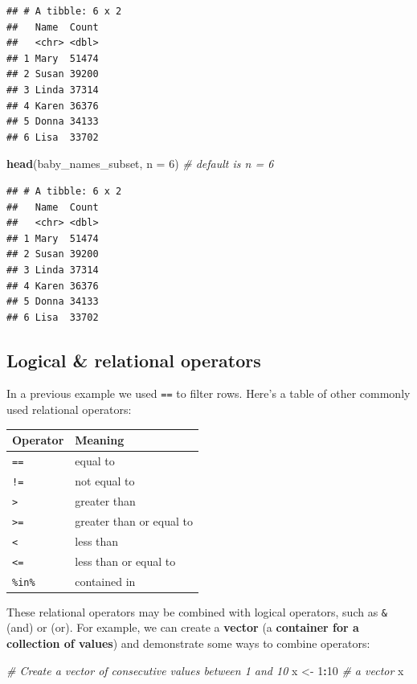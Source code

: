 \documentclass[
]{book}
\newenvironment{Shaded}{\begin{snugshade}}{\end{snugshade}}
\newcommand{\CommentTok}[1]{\textcolor[rgb]{0.56,0.35,0.01}{\textit{#1}}}
\newcommand{\DataTypeTok}[1]{\textcolor[rgb]{0.13,0.29,0.53}{#1}}
\newcommand{\DecValTok}[1]{\textcolor[rgb]{0.00,0.00,0.81}{#1}}
\newcommand{\KeywordTok}[1]{\textcolor[rgb]{0.13,0.29,0.53}{\textbf{#1}}}
\newcommand{\NormalTok}[1]{#1}
\newcommand{\OperatorTok}[1]{\textcolor[rgb]{0.81,0.36,0.00}{\textbf{#1}}}
\newcommand{\StringTok}[1]{\textcolor[rgb]{0.31,0.60,0.02}{#1}}
\begin{document}
\begin{verbatim}
## # A tibble: 6 x 2
##   Name  Count
##   <chr> <dbl>
## 1 Mary  51474
## 2 Susan 39200
## 3 Linda 37314
## 4 Karen 36376
## 5 Donna 34133
## 6 Lisa  33702
\end{verbatim}

\begin{Shaded}
\begin{Highlighting}[]
\KeywordTok{head}\NormalTok{(baby\_names\_subset, }\DataTypeTok{n =} \DecValTok{6}\NormalTok{) }\CommentTok{\# default is n = 6}
\end{Highlighting}
\end{Shaded}

\begin{verbatim}
## # A tibble: 6 x 2
##   Name  Count
##   <chr> <dbl>
## 1 Mary  51474
## 2 Susan 39200
## 3 Linda 37314
## 4 Karen 36376
## 5 Donna 34133
## 6 Lisa  33702
\end{verbatim}

\hypertarget{logical-relational-operators}{%
\subsection{Logical \& relational operators}\label{logical-relational-operators}}

In a previous example we used \texttt{==} to filter rows. Here's a table of other commonly used relational operators:

\begin{longtable}[]{@{}ll@{}}
\toprule
Operator & Meaning\tabularnewline
\midrule
\endhead
\texttt{==} & equal to\tabularnewline
\texttt{!=} & not equal to\tabularnewline
\texttt{\textgreater{}} & greater than\tabularnewline
\texttt{\textgreater{}=} & greater than or equal to\tabularnewline
\texttt{\textless{}} & less than\tabularnewline
\texttt{\textless{}=} & less than or equal to\tabularnewline
\texttt{\%in\%} & contained in\tabularnewline
\bottomrule
\end{longtable}

These relational operators may be combined with logical operators, such as \texttt{\&} (and) or \texttt{\textbar{}} (or). For example, we can create a \textbf{vector} (a \textbf{container for a collection of values}) and demonstrate some ways to combine operators:

\begin{Shaded}
\begin{Highlighting}[]
\CommentTok{\# Create a vector of consecutive values between 1 and 10}
\NormalTok{x \textless{}{-}}\StringTok{ }\DecValTok{1}\OperatorTok{:}\DecValTok{10} \CommentTok{\# a vector}
\NormalTok{x}
\end{Highlighting}
\end{Shaded}
\end{document}
